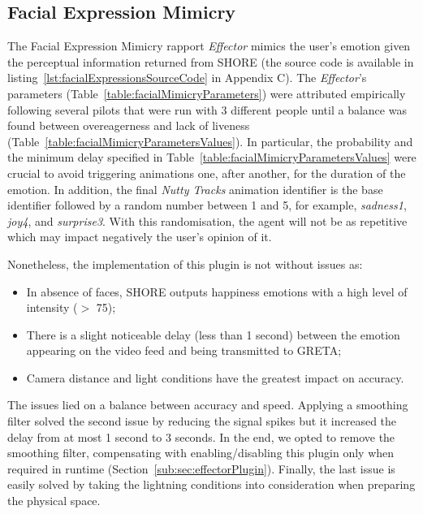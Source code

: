 \subsection{Facial Expression Mimicry}
\label{sub:sec:FacialExpressionMimicry}

The Facial Expression Mimicry rapport \textit{Effector} mimics the user's emotion given the perceptual information returned from SHORE (the source code is available in listing~\ref{lst:facialExpressionsSourceCode} in Appendix C). The \textit{Effector}'s parameters (Table~\ref{table:facialMimicryParameters}) were attributed empirically following several pilots that were run with 3 different people until a balance was found between overeagerness and lack of liveness (Table~\ref{table:facialMimicryParametersValues}). In particular, the probability and the minimum delay specified in Table~\ref{table:facialMimicryParametersValues} were crucial to avoid triggering animations one, after another, for the duration of the emotion. In addition, the final \textit{Nutty Tracks} animation identifier is the base identifier followed by a random number between 1 and 5, for example, \textit{sadness1}, \textit{joy4}, and \textit{surprise3}. With this randomisation, the agent will not be as repetitive which may impact negatively the user's opinion of it. %

Nonetheless, the implementation of this plugin is not without issues as:
\begin{itemize}
    \item In absence of faces, SHORE outputs happiness emotions with a high level of intensity ($>$ 75);
    \item There is a slight noticeable delay (less than 1 second) between the emotion appearing on the video feed and being transmitted to GRETA;
    \item Camera distance and light conditions have the greatest impact on accuracy.
\end{itemize}

The issues lied on a balance between accuracy and speed. Applying a smoothing filter solved the second issue by reducing the signal spikes but it increased the delay from at most 1 second to 3 seconds. In the end, we opted to remove the smoothing filter, compensating with enabling/disabling this plugin only when required in runtime (Section~\ref{sub:sec:effectorPlugin}). Finally, the last issue is easily solved by taking the lightning conditions into consideration when preparing the physical space.

